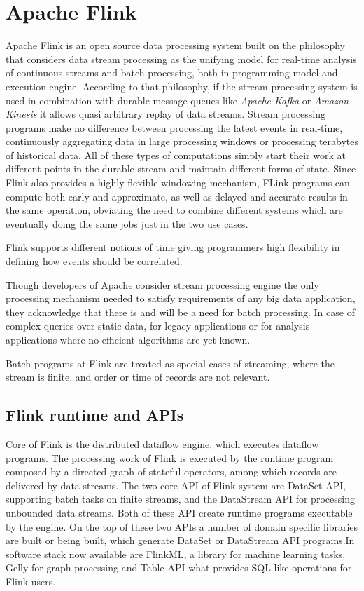 \section{Apache Flink}\label{flink}
Apache Flink is an open source data processing system built on the philosophy that considers data stream processing as the unifying model for real-time analysis of continuous streams and batch processing, both in  programming model and execution engine. 
According to that philosophy, if the stream processing system is used in combination with durable message queues like \textit{Apache Kafka} or \textit{Amazon Kinesis}  
it allows quasi arbitrary replay of data streams. Stream processing programs make no difference between processing the latest events in real-time, 
continuously aggregating data in large processing windows or processing terabytes of historical data. All of these types of computations  simply start their work at 
different points in the durable stream and maintain different forms of state. Since Flink also provides a highly flexible windowing mechanism, 
FLink programs can compute both early and approximate, as well as delayed and accurate results in the same operation, obviating the need to combine different systems which are eventually doing the same jobs 
just in the two use cases.

Flink supports different notions of time giving programmers high flexibility in defining how events should be correlated.

Though developers of Apache consider stream processing engine the only processing mechanism needed to satisfy requirements of any big data application, they acknowledge that there is and will be a need for batch processing. In case of complex queries over static data, for legacy applications or for analysis applications where no efficient  algorithms  are yet known.

Batch programs at Flink are treated as special cases of streaming, where the stream is finite, and order or time of records are not relevant.

\subsection{Flink runtime and APIs}
Core of Flink is the distributed dataflow engine, which executes dataflow programs. The processing work of Flink is executed by the runtime program composed by a directed graph of stateful operators, among which records are delivered by data streams. The two core API of Flink system are DataSet API, supporting batch tasks on finite streams, and the DataStream API  for processing unbounded data streams. Both of these API create runtime programs executable by the engine.
On the top of these two APIs a number of domain specific libraries are built or being built, which generate DataSet or DataStream  API programs.In software stack now available are FlinkML, a library for machine learning tasks, Gelly for graph processing and Table API what provides SQL-like operations for Flink users.

